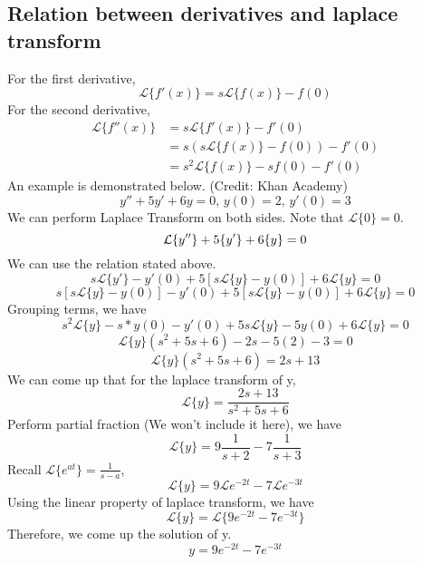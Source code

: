 \documentclass{article}
\begin{document}
\subsection{Relation between derivatives and laplace transform}
For the first derivative,
\begin{equation*}
	\mathcal{L}\{f'(x)\} = s\mathcal{L}\{f(x)\} - f(0)
\end{equation*}
For the second derivative,
\begin{align*} 
	\mathcal{L}\{f''(x)\} &= s\mathcal{L}\{f'(x)\} - f'(0)\\
											 &= s(s\mathcal{L}\{f(x)\} - f(0)) - f'(0)\\
											 &= s^2\mathcal{L}\{f(x)\} - sf(0) - f'(0)
\end{align*}
An example is demonstrated below. (Credit: Khan Academy)
\begin{equation*}
	y''+5y'+6y=0\text{, }
	y(0) = 2\text{, }
	y'(0) = 3
\end{equation*}
We can perform Laplace Transform on both sides. Note that $\mathcal{L}\{0\} = 0$.
\begin{equation*}
	\mathcal{L}\{y''\} + 5\mathcal\{y'\} + 6\mathcal\{y\} = 0	
\end{equation*}
We can use the relation stated above.
\begin{equation*}
	s\mathcal{L}\{y'\} - y'(0) + 5[s\mathcal{L}\{y\} - y(0)] + 6\mathcal{L}\{y\} = 0
\end{equation*}
\begin{equation*}
	s[s\mathcal{L}\{y\} - y(0)] - y'(0) + 5[s\mathcal{L}\{y\} - y(0)] + 6\mathcal{L}\{y\}= 0
\end{equation*}
Grouping terms, we have
\begin{equation*}
	s^2\mathcal{L}\{y\} - s*y(0) - y'(0) + 5s\mathcal{L}\{y\} - 5y(0) + 6\mathcal{L}\{y\} = 0
\end{equation*}
\begin{equation*}
	\mathcal{L}\{y\}(s^2+5s+6)-2s-5(2)-3 = 0
\end{equation*}
\begin{equation*}
	\mathcal{L}\{y\}(s^2+5s+6) = 2s+13
\end{equation*}
We can come up that for the laplace transform of y,
\begin{equation*}
	\mathcal{L}\{y\}=\frac{2s+13}{s^2+5s+6}
\end{equation*}
Perform partial fraction (We won't include it here), we have
\begin{equation*}
	\mathcal{L}\{y\} = 9\frac{1}{s+2} - 7\frac{1}{s+3}
\end{equation*}
Recall $\mathcal{L}\{e^{at}\} = \frac{1}{s-a}$,
\begin{equation*}
	\mathcal{L}\{y\} = 9\mathcal{L}{e^{-2t}} - 7\mathcal{L}{e^{-3t}}
\end{equation*}
Using the linear property of laplace transform, we have
\begin{equation*}
	\mathcal{L}\{y\} = \mathcal{L}\{9e^{-2t}-7e^{-3t}\}
\end{equation*}
Therefore, we come up the solution of y.
\begin{equation*}
	y = 9e^{-2t}-7e^{-3t}
\end{equation*}
\end{document}
